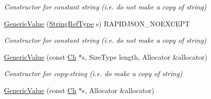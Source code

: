 \begin{DoxyCompactItemize}
\begin{DoxyCompactList}\small\item\em Constructor for constant string (i.\+e. do not make a copy of string) \end{DoxyCompactList}\item 
\hyperlink{class_generic_value_abb2887958974fef1b2b5c8e32cc72ddb}{Generic\+Value} (\hyperlink{class_generic_value_a32e0f30ee278072374c8168b14d3317f}{String\+Ref\+Type} s) R\+A\+P\+I\+D\+J\+S\+O\+N\+\_\+\+N\+O\+E\+X\+C\+E\+PT\hypertarget{class_generic_value_abb2887958974fef1b2b5c8e32cc72ddb}{}\label{class_generic_value_abb2887958974fef1b2b5c8e32cc72ddb}

\begin{DoxyCompactList}\small\item\em Constructor for constant string (i.\+e. do not make a copy of string) \end{DoxyCompactList}\item 
\hyperlink{class_generic_value_a9ec2c7cda8c8845acfa3565c6b1b4e10}{Generic\+Value} (const \hyperlink{class_generic_value_ade0e0ce64ccd5d852da57a35e720bafb}{Ch} $\ast$s, Size\+Type length, Allocator \&allocator)\hypertarget{class_generic_value_a9ec2c7cda8c8845acfa3565c6b1b4e10}{}\label{class_generic_value_a9ec2c7cda8c8845acfa3565c6b1b4e10}

\begin{DoxyCompactList}\small\item\em Constructor for copy-\/string (i.\+e. do make a copy of string) \end{DoxyCompactList}\item 
\hyperlink{class_generic_value_a9b72b2e3347d4cd77b16c3b45e8decf1}{Generic\+Value} (const \hyperlink{class_generic_value_ade0e0ce64ccd5d852da57a35e720bafb}{Ch} $\ast$s, Allocator \&allocator)\hypertarget{class_generic_value_a9b72b2e3347d4cd77b16c3b45e8decf1}{}\label{class_generic_value_a9b72b2e3347d4cd77b16c3b45e8decf1}


\end{DoxyCompactItemize}
